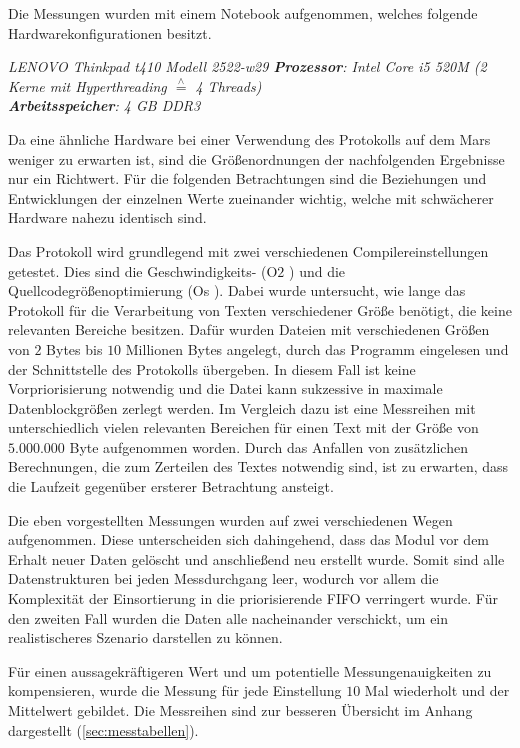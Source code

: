 \label{subCap:Messreihen}

Die Messungen wurden mit einem Notebook aufgenommen, welches
folgende Hardwarekonfigurationen besitzt.

\textit{
	LENOVO Thinkpad t410 Modell 2522-w29 \newline
	\textbf{Prozessor}: Intel Core i5 520M (2 Kerne mit Hyperthreading $\stackrel{\wedge}=$ 4 Threads)\\
	\textbf{Arbeitsspeicher}: 4 GB DDR3	
	}

Da eine ähnliche Hardware bei einer Verwendung des Protokolls auf dem Mars
weniger zu erwarten ist, sind die Größenordnungen der nachfolgenden Ergebnisse
nur ein Richtwert. Für die folgenden Betrachtungen sind die Beziehungen und
Entwicklungen der einzelnen Werte zueinander wichtig, welche mit schwächerer
Hardware nahezu identisch sind.

Das Protokoll wird grundlegend mit zwei verschiedenen
Compilereinstellungen getestet. Dies sind die Geschwindigkeits- (\glqq O$2$
\grqq) und die Quellcodegrößenoptimierung (\glqq Os \grqq). Dabei
wurde untersucht, wie lange das Protokoll für die Verarbeitung von Texten
verschiedener Größe benötigt, die keine relevanten Bereiche besitzen. Dafür
wurden Dateien mit verschiedenen Größen von $2$ Bytes bis $10$ Millionen Bytes 
angelegt, durch das Programm eingelesen und der Schnittstelle des Protokolls
übergeben. In diesem Fall ist keine Vorpriorisierung notwendig und die Datei
kann sukzessive in maximale Datenblockgrößen zerlegt werden.
Im Vergleich dazu ist eine Messreihen mit unterschiedlich vielen relevanten
Bereichen für einen Text mit der Größe von $5.000.000$ Byte aufgenommen
worden.
Durch das Anfallen von zusätzlichen Berechnungen, die zum Zerteilen 
des Textes notwendig sind, ist zu erwarten, dass die Laufzeit gegenüber
ersterer Betrachtung ansteigt.

Die eben vorgestellten Messungen wurden auf zwei verschiedenen Wegen
aufgenommen. Diese unterscheiden sich dahingehend, dass das Modul vor dem Erhalt
neuer Daten gelöscht und anschließend neu erstellt wurde. Somit sind alle
Datenstrukturen bei jeden Messdurchgang leer, wodurch vor allem die Komplexität
der Einsortierung in die priorisierende \gls{FIFO} verringert wurde. Für den
zweiten Fall wurden die Daten alle nacheinander verschickt, um ein realistischeres
Szenario darstellen zu können.

Für einen aussagekräftigeren Wert und um potentielle Messungenauigkeiten zu
kompensieren, wurde die Messung für jede Einstellung $10$ Mal wiederholt und der
Mittelwert gebildet. Die Messreihen sind zur besseren Übersicht im
Anhang dargestellt (\ref{sec:messtabellen}).